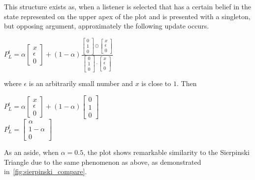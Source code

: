 This structure exists as, when a listener is selected that has a certain belief in the state represented on the upper apex of the plot and is presented with a singleton, but opposing argument, approximately the following update occurs. 


\begin{center}
$P^t_L = \alpha \begin{bmatrix}
    x\\
    \epsilon\\
    0
\end{bmatrix} + (1 - \alpha) \frac{\begin{bmatrix} 0\\1\\0 \end{bmatrix} \odot \begin{bmatrix} x\\ \epsilon\\ 0 \end{bmatrix}} {\begin{bmatrix} 0\\1\\0 \end{bmatrix} \cdot \begin{bmatrix} x\\ \epsilon \\ 0\end{bmatrix}} $ \\
\end{center}
where $\epsilon$ is an arbitrarily small number and $x$ is close to $1$. Then 
\begin{center}
$P^t_L =\alpha \begin{bmatrix}
    x\\
    \epsilon\\
    0
\end{bmatrix} + (1 - \alpha) \begin{bmatrix} 0\\ 1 \\ 0  \end{bmatrix} $ \\

$P^t_L = \begin{bmatrix} \alpha \\ 1 - \alpha \\ 0  \end{bmatrix}$
\end{center}

As an aside, when $\alpha = 0.5$, the plot shows remarkable similarity to the Sierpinski Triangle due to the same phenomenon as above, as demonstrated in~\cref{fig:sierpinski_compare}. 

